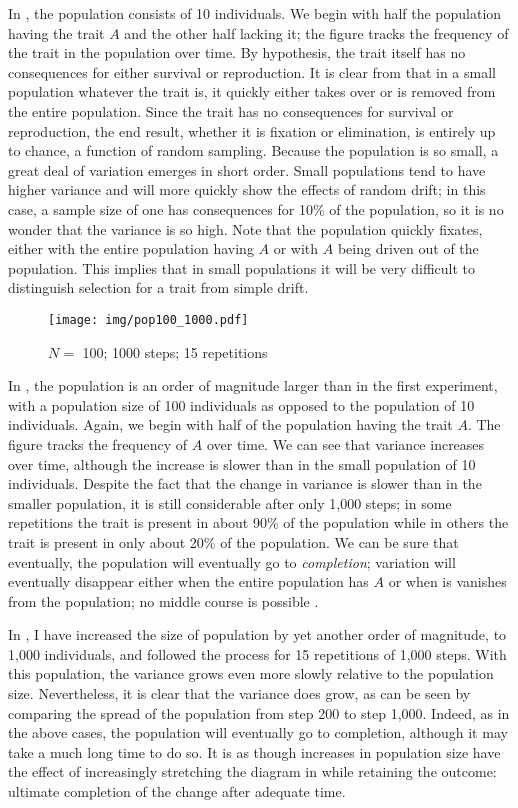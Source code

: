 \documentclass[output=paper]{langsci/langscibook}
\begin{document}
In , the population consists of 10 individuals.
We begin with half the population having the trait $A$ and the other
half lacking it; the figure tracks the frequency of the trait in the
population over time.  By hypothesis, the trait itself has no
consequences for either survival or reproduction.  It is clear from
 that in a small population whatever the trait
is, it quickly either takes over or is removed from the entire
population.  Since the trait has no consequences for survival or
reproduction, the end result, whether it is fixation or elimination,
is entirely up to chance, a function of random sampling.  Because the
population is so small, a great deal of variation emerges in short
order.  Small populations tend to have higher variance and will more
quickly show the effects of random drift; in this case, a sample size
of one has consequences for 10\% of the population, so it is no wonder
that the variance is so high.  Note that the population quickly
fixates, either with the entire population having $A$ or with $A$
being driven out of the population.  This implies that in small
populations it will be very difficult to distinguish selection for a
trait from simple drift.

\begin{figure}
    \texttt{[image: img/pop100\_1000.pdf]}
    \caption{$N=$ \num{100}; \num{1000} steps; 15 repetitions\label{random_fig2}}
\end{figure}

In , the population is an order of magnitude
larger than in the first experiment, with a population size of 100
individuals as opposed to the population of 10 individuals.  Again, we
begin with half of the population having the trait $A$. The figure
tracks the frequency of $A$ over time.  We can see that
variance increases over time, although the increase is slower than in
the small population of 10 individuals.  Despite the fact that the
change in variance is slower than in the smaller population, it is
still considerable after only 1,000 steps; in some repetitions the
trait is present in about 90\% of the population while in others the
trait is present in only about 20\% of the population.  We can be sure
that eventually, the population will eventually go to
\emph{completion}; variation will eventually disappear either when the
entire population has $A$ or when is vanishes from the population; no
middle course is possible \citep{sigmund:1993}.

In , I have increased the size of population by
yet another order of magnitude, to 1,000 individuals, and followed the
process for 15 repetitions of 1,000 steps.  With this population, the
variance grows even more slowly relative to the population size.
Nevertheless, it is clear that the variance does grow, as can be seen
by comparing the spread of the population from step 200 to step 1,000.
Indeed, as in the above cases, the population will eventually go to
completion, although it may take a much long time to do so.  It is as
though increases in population size have the effect of increasingly
stretching the diagram in  while retaining the
outcome: ultimate completion of the change after adequate time.
\end{document}
